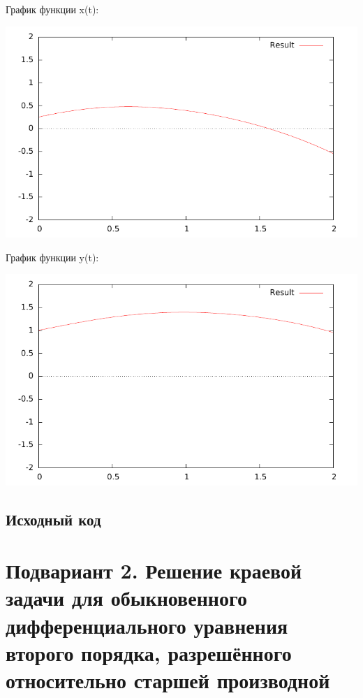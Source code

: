 \documentclass[a4paper,11pt]{report}
\begin{document}
График функции x(t):

\includegraphics{../plots/test5_1.pdf}

График функции y(t):

\includegraphics{../plots/test5_2.pdf}

\subsection*{Исходный код}




\newpage

\section*{Подвариант 2. Решение краевой задачи для обыкновенного дифференциального уравнения второго порядка, разрешённого
относительно старшей производной}
\end{document}
